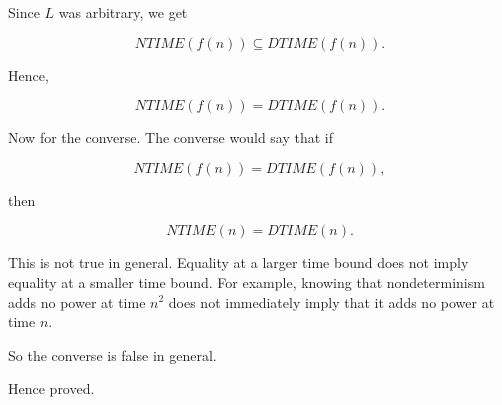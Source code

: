\documentclass[11pt]{article}
\begin{document}
Since $L$ was arbitrary, we get

\[
NTIME(f(n)) \subseteq DTIME(f(n)).
\]

Hence,

\[
NTIME(f(n)) = DTIME(f(n)).
\]

Now for the converse. The converse would say that if

\[
NTIME(f(n)) = DTIME(f(n)),
\]

then

\[
NTIME(n) = DTIME(n).
\]

This is not true in general. Equality at a larger time bound does not imply equality at a smaller time bound. For example, knowing that nondeterminism adds no power at time $n^2$ does not immediately imply that it adds no power at time $n$.

So the converse is false in general.

Hence proved.
\end{document}
